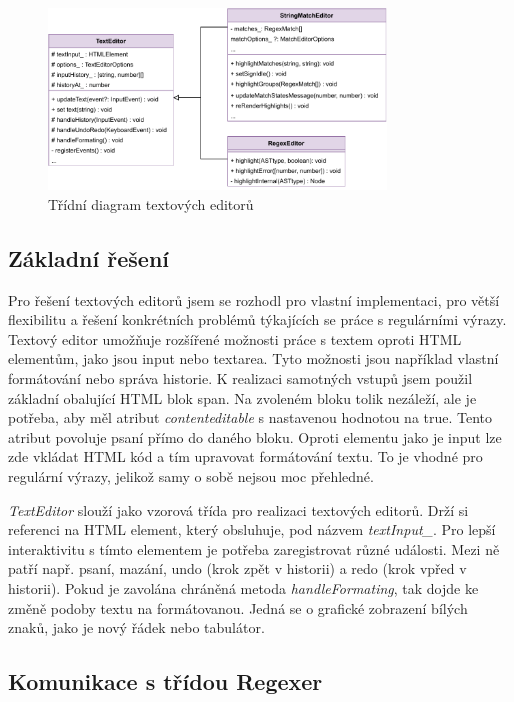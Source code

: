 \begin{figure}[!h]
	\centering
	\includegraphics[width=0.8\textwidth]{Figures/TextEditor.pdf}
	\caption{Třídní diagram textových editorů}
	\label{fig:TextEditor}
\end{figure} 

\subsection*{Základní řešení}

Pro řešení textových editorů jsem se rozhodl pro vlastní implementaci, pro větší flexibilitu a řešení konkrétních problémů týkajících se práce s regulárními výrazy.
Textový editor umožňuje rozšířené možnosti práce s textem oproti HTML elementům, jako jsou input nebo textarea.
Tyto možnosti jsou například vlastní formátování nebo správa historie. 
K realizaci samotných vstupů jsem použil základní obalující HTML blok span.
Na zvoleném bloku tolik nezáleží, ale je potřeba, aby měl atribut \textit{contenteditable} s nastavenou hodnotou na true.
Tento atribut povoluje psaní přímo do daného bloku. 
Oproti elementu jako je input lze zde vkládat HTML kód a tím upravovat formátování textu.
To je vhodné pro regulární výrazy, jelikož samy o sobě nejsou moc přehledné.

\textit{TextEditor} slouží jako vzorová třída pro realizaci textových editorů.
Drží si referenci na HTML element, který obsluhuje, pod názvem \textit{textInput\_}. 
Pro lepší interaktivitu s tímto elementem je potřeba zaregistrovat různé události.
Mezi ně patří např. psaní, mazání, undo (krok zpět v historii) a redo (krok vpřed v historii). 
Pokud je zavolána chráněná metoda \textit{handleFormating}, tak dojde ke změně podoby textu na formátovanou.
Jedná se o grafické zobrazení bílých znaků, jako je nový řádek nebo tabulátor.

\subsection*{Komunikace s třídou Regexer}


